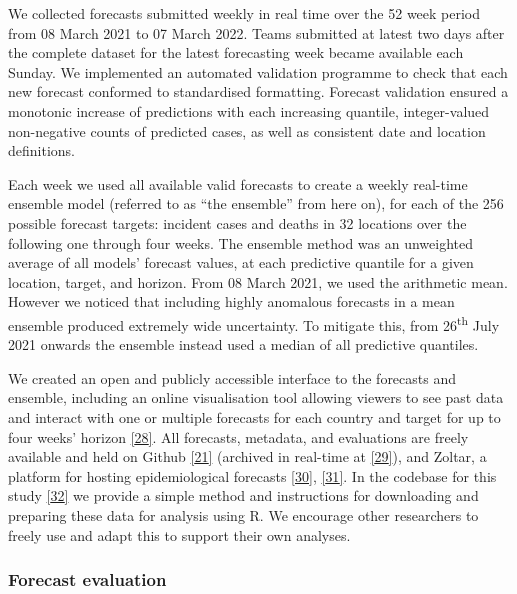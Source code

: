 \documentclass[
]{article}
\begin{document}
We collected forecasts submitted weekly in real time over the 52 week period from 08 March 2021 to 07 March 2022. Teams submitted at latest two days after the complete dataset for the latest forecasting week became available each Sunday. We implemented an automated validation programme to check that each new forecast conformed to standardised formatting. Forecast validation ensured a monotonic increase of predictions with each increasing quantile, integer-valued non-negative counts of predicted cases, as well as consistent date and location definitions.

Each week we used all available valid forecasts to create a weekly real-time ensemble model (referred to as ``the ensemble'' from here on), for each of the 256 possible forecast targets: incident cases and deaths in 32 locations over the following one through four weeks. The ensemble method was an unweighted average of all models' forecast values, at each predictive quantile for a given location, target, and horizon. From 08 March 2021, we used the arithmetic mean. However we noticed that including highly anomalous forecasts in a mean ensemble produced extremely wide uncertainty. To mitigate this, from 26\textsuperscript{th} July 2021 onwards the ensemble instead used a median of all predictive quantiles.

We created an open and publicly accessible interface to the forecasts and ensemble, including an online visualisation tool allowing viewers to see past data and interact with one or multiple forecasts for each country and target for up to four weeks' horizon \protect\hyperlink{ref-europeancovid-19forecasthubEuropeanCovid19Forecast}{{[}28{]}}. All forecasts, metadata, and evaluations are freely available and held on Github \protect\hyperlink{ref-europeancovid-19forecasthubEuropeanCOVID19Forecast2021}{{[}21{]}} (archived in real-time at \protect\hyperlink{ref-katharine_sherratt_2022_7356267}{{[}29{]}}), and Zoltar, a platform for hosting epidemiological forecasts \protect\hyperlink{ref-epiforecastsProjectECDCEuropean2021}{{[}30{]}}, \protect\hyperlink{ref-reichZoltarForecastArchive2021}{{[}31{]}}. In the codebase for this study \protect\hyperlink{ref-PredictivePerformanceMultimodel2022}{{[}32{]}} we provide a simple method and instructions for downloading and preparing these data for analysis using R. We encourage other researchers to freely use and adapt this to support their own analyses.

\hypertarget{forecast-evaluation}{%
\subsubsection{Forecast evaluation}\label{forecast-evaluation}}
\end{document}

